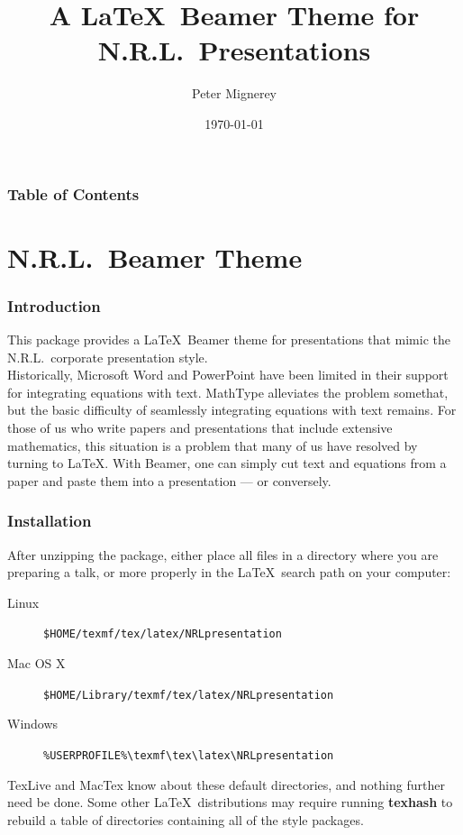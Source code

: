 \documentclass{beamer}
\title{A \LaTeX\ Beamer Theme for\\ N.R.L.\ Presentations}
\author{Peter Mignerey}
\institute{U.S. Naval Research Laboratory\\Acoustics Division, Washington DC}
\date{\today}
\begin{document}
\begin{frame}
  \titlepage
\end{frame}

\begin{frame}
  \frametitle{Table of Contents}
  \tableofcontents
\end{frame}

\section{N.R.L.\ Beamer Theme}

\begin{frame}
  \frametitle{Introduction}
  This package provides a \LaTeX\ Beamer theme for presentations that mimic the N.R.L.\ corporate presentation style.
  \\\vspace{1em}
  Historically, Microsoft Word and PowerPoint have been limited in their support for integrating equations with text.
  MathType alleviates the problem somethat, but the basic difficulty of seamlessly integrating equations with text remains.
  For those of us who write papers and presentations that include extensive mathematics, 
  this situation is a problem that many of us have resolved by turning to \LaTeX.
  With Beamer, one can simply cut text and equations from a paper and paste them into a presentation --- or conversely.
\end{frame}

\begin{frame}
  \frametitle{Installation}
  After unzipping the package, either place all files in a directory where you are preparing a talk, or more properly in the \LaTeX\ search path on your computer:
  \begin{description}
  \item[Linux] {\tt \$HOME/texmf/tex/latex/NRLpresentation}
  \item[Mac OS X] {\tt \$HOME/Library/texmf/tex/latex/NRLpresentation}
  \item[Windows] {\tt \%USERPROFILE\%\textbackslash{texmf}\textbackslash{tex}\textbackslash{latex}\textbackslash{NRLpresentation}}
  \end{description}
  TexLive and MacTex know about these default directories, and nothing further need be done.  
  Some other \LaTeX\ distributions may require running {\bf texhash} to rebuild a table of directories containing all of the style packages.
\end{frame}
\end{document}
